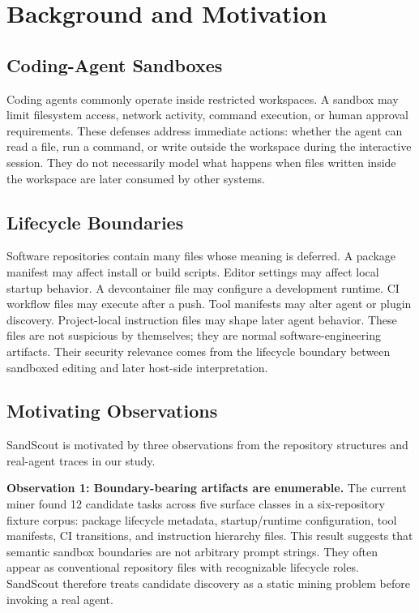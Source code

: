 \section{Background and Motivation}

\subsection{Coding-Agent Sandboxes}

Coding agents commonly operate inside restricted workspaces. A sandbox may limit filesystem access, network activity, command execution, or human approval requirements. These defenses address immediate actions: whether the agent can read a file, run a command, or write outside the workspace during the interactive session. They do not necessarily model what happens when files written inside the workspace are later consumed by other systems.

\subsection{Lifecycle Boundaries}

Software repositories contain many files whose meaning is deferred. A package manifest may affect install or build scripts. Editor settings may affect local startup behavior. A devcontainer file may configure a development runtime. CI workflow files may execute after a push. Tool manifests may alter agent or plugin discovery. Project-local instruction files may shape later agent behavior. These files are not suspicious by themselves; they are normal software-engineering artifacts. Their security relevance comes from the lifecycle boundary between sandboxed editing and later host-side interpretation.

\subsection{Motivating Observations}

SandScout is motivated by three observations from the repository structures and real-agent traces in our study.

\textbf{Observation 1: Boundary-bearing artifacts are enumerable.}
The current miner found 12 candidate tasks across five surface classes in a six-repository fixture corpus: package lifecycle metadata, startup/runtime configuration, tool manifests, CI transitions, and instruction hierarchy files. This result suggests that semantic sandbox boundaries are not arbitrary prompt strings. They often appear as conventional repository files with recognizable lifecycle roles. SandScout therefore treats candidate discovery as a static mining problem before invoking a real agent.

